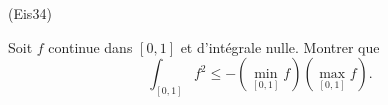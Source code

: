 \begin{tiny}(Eis34)\end{tiny} Soit $f$ continue dans $\left[0,1 \right]$ et d'intégrale nulle. Montrer que
\[
  \int_{\left[ 0,1 \right]}f^2 \leq - \left(\min_{\left[ 0,1 \right]}f\right) \left(\max_{\left[ 0,1 \right]}f\right).
\]
